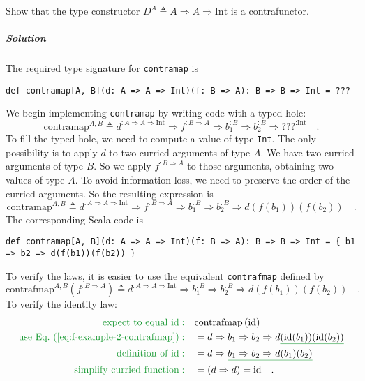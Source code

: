 Show that the type constructor $D^{A}\triangleq A\Rightarrow A\Rightarrow\text{Int}$
is a contrafunctor.

\subparagraph{Solution}

The required type signature for \lstinline!contramap! is
\begin{lstlisting}
def contramap[A, B](d: A => A => Int)(f: B => A): B => B => Int = ???
\end{lstlisting}
We begin implementing \lstinline!contramap! by writing code with
a typed hole:
\[
\text{contramap}^{A,B}\triangleq d^{:A\Rightarrow A\Rightarrow\text{Int}}\Rightarrow f^{:B\Rightarrow A}\Rightarrow b_{1}^{:B}\Rightarrow b_{2}^{:B}\Rightarrow\text{???}^{:\text{Int}}\quad.
\]
To fill the typed hole, we need to compute a value of type \lstinline!Int!.
The only possibility is to apply $d$ to two curried arguments of
type $A$. We have two curried arguments of type $B$. So we apply
$f^{:B\Rightarrow A}$ to those arguments, obtaining two values of
type $A$. To avoid information loss, we need to preserve the order
of the curried arguments. So the resulting expression is
\[
\text{contramap}^{A,B}\triangleq d^{:A\Rightarrow A\Rightarrow\text{Int}}\Rightarrow f^{:B\Rightarrow A}\Rightarrow b_{1}^{:B}\Rightarrow b_{2}^{:B}\Rightarrow d\left(f(b_{1})\right)\left(f(b_{2})\right)\quad.
\]
The corresponding Scala code is 
\begin{lstlisting}
def contramap[A, B](d: A => A => Int)(f: B => A): B => B => Int = { b1 => b2 => d(f(b1))(f(b2)) }
\end{lstlisting}
To verify the laws, it is easier to use the equivalent \lstinline!contrafmap!
defined by
\begin{equation}
\text{contrafmap}^{A,B}(f^{:B\Rightarrow A})\triangleq d^{:A\Rightarrow A\Rightarrow\text{Int}}\Rightarrow b_{1}^{:B}\Rightarrow b_{2}^{:B}\Rightarrow d\left(f(b_{1})\right)\left(f(b_{2})\right)\quad.\label{eq:f-example-2-contrafmap}
\end{equation}
To verify the identity law:
\begin{align*}
{\color{greenunder}\text{expect to equal }\text{id}:}\quad & \text{contrafmap}\left(\text{id}\right)\\
{\color{greenunder}\text{use Eq.~(\ref{eq:f-example-2-contrafmap})}:}\quad & =d\Rightarrow b_{1}\Rightarrow b_{2}\Rightarrow d\gunderline{\left(\text{id}(b_{1})\right)}\gunderline{\left(\text{id}(b_{2})\right)}\\
{\color{greenunder}\text{definition of }\text{id}:}\quad & =d\Rightarrow\gunderline{b_{1}\Rightarrow b_{2}\Rightarrow d(b_{1})(b_{2})}\\
{\color{greenunder}\text{simplify curried function}:}\quad & =\left(d\Rightarrow d\right)=\text{id}\quad.
\end{align*}
